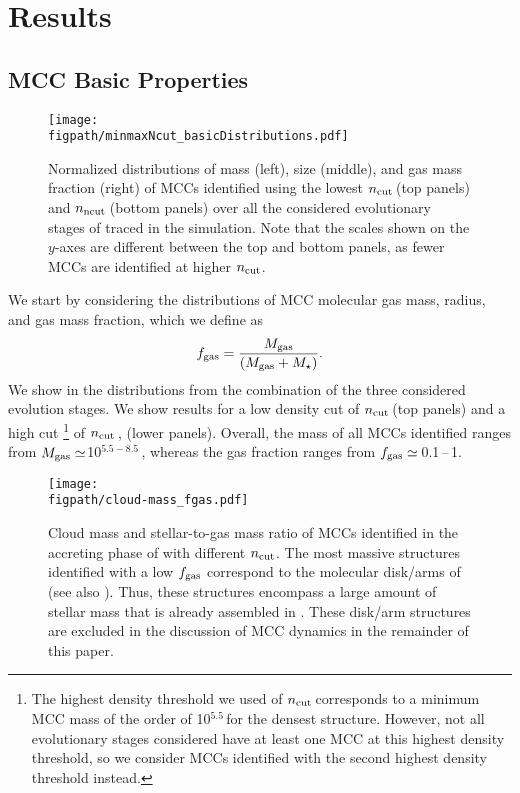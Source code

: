 \IfFileExists{emulateapjlegacy.cls}{\documentclass[iop]{emulateapjlegacy}}{\documentclass[iop]{emulateapj}}
\def\figpath{./Fig}
\begin{document}
\section{Results}\label{sec:results}

\subsection{MCC Basic Properties} \label{sec:dist}
\begin{figure*}[htbp]
\centering
\texttt{[image: \\figpath/minmaxNcut\_basicDistributions.pdf]}
\caption{Normalized distributions of mass (left), size (middle), and gas mass fraction (right) of MCCs identified using the lowest $n_{\rm cut}$\,\cc (top panels) and $n_{\rm ncut}$\,\cc (bottom panels) over all the considered evolutionary stages of \flower traced in the simulation. Note that the scales shown on the $y$-axes are different between the top and bottom panels, as fewer MCCs are identified at higher $n_{\rm cut}$.
\label{fig:dist}}
\end{figure*}

We start by considering the distributions of MCC molecular gas mass, radius, and gas mass fraction, which we define as
\begin{equation}
f_{\rm gas} = \frac{M_{\rm gas}} {\left(M_{\rm gas} + M_\star\right)}.
\end{equation}
%
We show in  the distributions from the combination of the three considered evolution stages. We show results for a low density cut of $n_{\rm cut}$\,\cc (top panels) and a high cut \footnote{The highest density threshold we used of $n_{\rm cut}$\,\cc corresponds to a minimum MCC mass of the order of 10$^{5.5}$\,\Msun for the densest structure. However, not all evolutionary stages considered have at least one MCC at this highest density threshold, so we consider MCCs identified with the second highest density threshold instead.} of $n_{\rm cut}$\,\cc, (lower panels).
%
Overall, the mass of all MCCs identified ranges from $M_{\rm gas}\simeq$10$^{5.5-8.5}$\,\Msun, whereas the gas fraction ranges from $f_{\rm gas} \simeq$\,0.1\,--\,1.

\begin{figure}
\centering
\texttt{[image: \\figpath/cloud-mass\_fgas.pdf]}
\caption{Cloud mass and stellar-to-gas mass ratio of MCCs identified in the accreting phase of \flower with different $n_{\rm cut}$. The most massive structures identified with a low $f_{\rm gas}$ correspond to the molecular disk/arms of \flower (see also ).
%
Thus, these structures encompass a large amount of stellar mass that is already assembled in \flower. These disk/arm structures are excluded in the discussion of MCC dynamics in the remainder of this paper. 
\label{fig:stellarRatio16}}
\end{figure}
\end{document}
